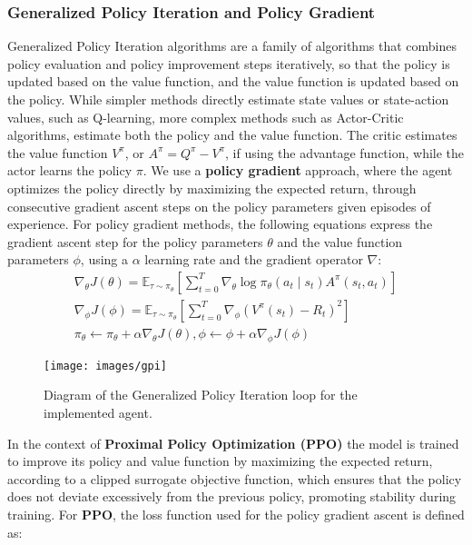 \subsubsection{Generalized Policy Iteration and Policy Gradient}
\label{subsubsec:gpi}
Generalized Policy Iteration algorithms are a family of algorithms that combines policy evaluation and policy improvement steps iteratively,
so that the policy is updated based on the value function, and the value function is updated based on the policy.
While simpler methods directly estimate state values or state-action values, such as Q-learning, more complex methods
such as Actor-Critic algorithms, estimate both the policy and the value function.
The critic estimates the value function $V^\pi$, or $A^{\pi} = Q^{\pi} - V^{\pi}$, if using the advantage function, while the actor learns the policy $\pi$.
We use a \textbf{policy gradient} approach, where the agent optimizes the policy directly by maximizing the expected return,
through consecutive gradient ascent steps on the policy parameters given episodes of experience.
For policy gradient methods, the following equations express the gradient ascent step for the
policy parameters $\theta$ and the value function parameters $\phi$, using a $\alpha$ learning rate and the gradient operator $\nabla$:
\begin{gather*}
    \nabla_{\theta} J(\theta) = \mathbb{E}_{\tau \sim \pi_{\theta}} \left[ \sum_{t=0}^{T} \nabla_{\theta} \log \pi_{\theta}(a_t \mid s_t) A^{\pi}(s_t, a_t) \right]\\
    \nabla_{\phi} J(\phi) = \mathbb{E}_{\tau \sim \pi_{\theta}} \left[ \sum_{t=0}^{T} \nabla_{\phi} \left( V^{\pi}(s_t) - R_t \right)^2 \right]\\
    \pi_{\theta} \leftarrow \pi_{\theta} + \alpha \nabla_{\theta} J(\theta), \phi \leftarrow \phi + \alpha \nabla_{\phi} J(\phi)
\end{gather*}
\begin{figure}
    \centering
    \texttt{[image: images/gpi]}
    \caption{Diagram of the Generalized Policy Iteration loop for the implemented agent.}
    \label{fig:gpi}
\end{figure}
In the context of \textbf{Proximal Policy Optimization (PPO)}
the model is trained to improve its policy and value function by maximizing the expected return,
according to a clipped surrogate objective function, which ensures that the policy does not deviate excessively from the previous policy,
promoting stability during training.
For \textbf{PPO}, the loss function used for the policy gradient ascent is defined as:
